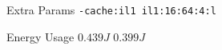 
        \begin{tcolorbox}[width=\linewidth, colback=white!95!black, colframe=white!95!black]
            
            
            Extra Params \hfill \verb|-cache:il1 il1:16:64:4:l|

            Energy Usage \hfill \st{$0.439J$} $0.399J$

        \end{tcolorbox}
    
